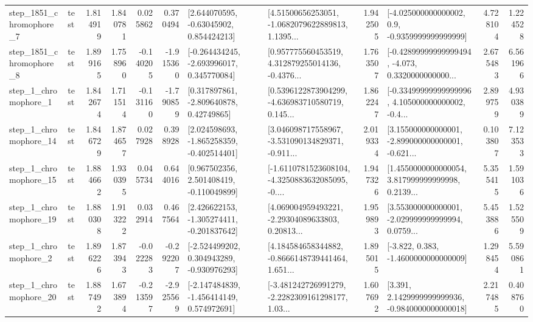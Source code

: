 \begin{tabular}{llrrrrllrlrr}
  step\_1851\_chromophore\_7 &      test &      1.814919 &    1.840781 &      0.025862 &  0.370494 &     [2.644070595, -0.63045902, 0.854424213] &  [4.51500656253051, -1.0682079622889813, 1.1395... &       1.942505 &     [-4.025000000000002, 0.9, -0.9359999999999999] &            4.728104 &          1.224528 \\
  step\_1851\_chromophore\_8 &      test &      1.899165 &    1.758960 &     -0.140205 & -1.915360 &   [-0.264434245, -2.693996017, 0.345770084] &  [0.957775560453519, 4.312879255014136, -0.4376... &       1.763507 &  [-0.42899999999999494, -4.073, 0.3320000000000... &            2.675483 &          6.561966 \\
     step\_1\_chromophore\_1 &      test &      1.842674 &    1.711514 &     -0.131160 & -1.790859 &     [0.317897861, -2.809640878, 0.42749865] &  [0.5396122873904299, -4.636983710580719, 0.145... &       1.862247 &  [-0.33499999999999996, 4.105000000000002, -0.4... &            2.899759 &          4.930389 \\
    step\_1\_chromophore\_14 &      test &      1.846729 &    1.874657 &      0.027928 &  0.398928 &   [2.024598693, -1.865258359, -0.402514401] &  [3.046098717558967, -3.531090134829371, -0.911... &       2.019334 &  [3.155000000000001, -2.899000000000001, -0.621... &            0.103807 &          7.123533 \\
    step\_1\_chromophore\_15 &      test &      1.884662 &    1.930395 &      0.045734 &  0.644016 &    [0.967502356, 2.501408419, -0.110049899] &  [-1.6110781523608104, -4.3250883632085095, -0.... &       1.947326 &  [1.4550000000000054, 3.817999999999998, 0.2139... &            5.355415 &          1.591036 \\
    step\_1\_chromophore\_19 &      test &      1.880308 &    1.913222 &      0.032914 &  0.467564 &   [2.426622153, -1.305274411, -0.201837642] &  [4.069004959493221, -2.29304089633803, 0.20813... &       1.959893 &  [3.553000000000001, -2.029999999999994, 0.0759... &            5.453886 &          1.525509 \\
     step\_1\_chromophore\_2 &      test &      1.896226 &    1.873943 &     -0.022283 & -0.292207 &   [-2.524499202, 0.304943289, -0.930976293] &  [4.184584658344882, -0.8666148739441464, 1.651... &       1.895015 &               [-3.822, 0.383, -1.4600000000000009] &            1.298454 &          5.590861 \\
    step\_1\_chromophore\_20 &      test &      1.887492 &    1.673894 &     -0.213597 & -2.925569 &   [-2.147484839, -1.456414149, 0.574972691] &  [-3.481242726991279, -2.2282309161298177, 1.03... &       1.607692 &   [3.391, 2.1429999999999936, -0.9840000000000018] &            2.217485 &          0.408760 \\

\end{tabular}
